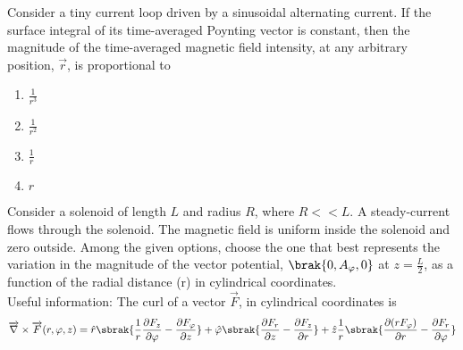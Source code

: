     \item Consider a tiny current loop driven by a sinusoidal alternating current. If the surface integral of its time-averaged Poynting vector is constant, then the magnitude of the time-averaged magnetic field intensity, at any arbitrary position, $\overrightarrow{r}$, is proportional to
    \begin{enumerate}
        \item $\frac{1}{r^3}$
        \item $\frac{1}{r^2}$
        \item $\frac{1}{r}$
        \item $r$
    \end{enumerate}

    \item Consider a solenoid of length $L$ and radius $R$, where $R << L$. A steady-current flows through the solenoid. The magnetic field is uniform inside the solenoid and zero outside.
    Among the given options, choose the one that best represents the variation in the magnitude of the vector potential, $\brak{0,A_\varphi,0}$ at $z = \frac{L}{2}$, as a function of the radial distance (r) in cylindrical coordinates.\\
    Useful information: The curl of a vector $\overrightarrow{F}$, in cylindrical coordinates is
    \begin{align*}
        \overrightarrow{\nabla} \times \overrightarrow{F}(r, \varphi, z) = \hat{r} \sbrak{ \frac{1}{r} \frac{\partial F_z}{\partial \varphi} - \frac{\partial F_\varphi}{\partial z} } + \hat{\varphi} \sbrak{ \frac{\partial F_r}{\partial z} - \frac{\partial F_z}{\partial r}} + \hat{z} \frac{1}{r} \sbrak{ \frac{\partial (r F_\varphi)}{\partial r} - \frac{\partial F_r}{\partial \varphi} }
    \end{align*}
